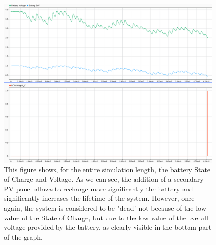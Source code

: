 \documentclass[a4paper]{article}
\begin{document}
        \begin{figure}[htp]
            \centering
            \includegraphics[width=0.8 \columnwidth]{./screenshots/SecondPart/2Minutes/Gmonths/BattV-BattSoC-isDischargedV.png}
            \caption{
                    \label{fig:BattV-BattSoC-isDischargedV}
                    This figure shows, for the entire simulation length, the battery State of Charge and Voltage. As we can see, the addition of a secondary PV panel allows to recharge more significantly the battery and significantly increases the lifetime of the system. However, once again, the system is considered to be "dead" not because of the low value of the State of Charge, but due to the low value of the overall voltage provided by the battery, as clearly visible in the bottom part of the graph.
            }
        \end{figure}
\end{document}
